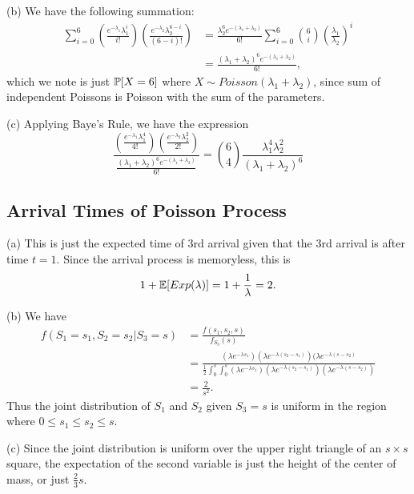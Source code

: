(b) We have the following summation:
\begin{align*}
    \sum_{i = 0}^6\left(\frac{e^{-\lambda_1}\lambda_1^i}{i!}\right)\left(\frac{e^{-\lambda_2}\lambda_2^{6 - i}}{(6 - i)!}\right) &= \frac{\lambda_2^6e^{-(\lambda_1 + \lambda_2)}}{6!}\sum_{i = 0}^6\binom{6}{i}\left(\frac{\lambda_1}{\lambda_2}\right)^i \\
    &= \frac{(\lambda_1 + \lambda_2)^6e^{-(\lambda_1 + \lambda_2)}}{6!},
\end{align*}
which we note is just $\P[X = 6]$ where $X \sim Poisson(\lambda_1 + \lambda_2)$, since sum of independent Poissons is Poisson with the sum of the parameters.

(c) Applying Baye's Rule, we have the expression
\[
    \frac{\left(\frac{e^{-\lambda_1}\lambda_1^4}{4!}\right)\left(\frac{e^{-\lambda_2}\lambda_2^2}{2!}\right)}{\frac{(\lambda_1 + \lambda_2)^6e^{-(\lambda_1 + \lambda_2)}}{6!}} = \binom{6}{4}\frac{\lambda_1^4\lambda_2^2}{(\lambda_1 + \lambda_2)^6}
\]


\subsection{Arrival Times of Poisson Process}

(a) This is just the expected time of 3rd arrival given that the 3rd arrival is after time $t = 1$. Since the arrival process is memoryless, this is 
\[
1 + \E[Exp(\lambda)] = 1 + \frac{1}{\lambda} = 2.
\]

(b) We have
\begin{align*}
    f(S_1 = s_1, S_2 = s_2 | S_3 = s) &= \frac{f(s_1, s_2, s)}{f_{S_3}(s)} \\
    &= \frac{(\lambda e^{-\lambda s_1})(\lambda e^{-\lambda (s_2 - s_1)})(\lambda e^{-\lambda (s - s_2)}}{\frac{1}{2}\int_0^s\int_0^s(\lambda e^{-\lambda s_1})(\lambda e^{-\lambda (s_2 - s_1)})(\lambda e^{-\lambda (s - s_2)})} \\
    &= \frac{2}{s^2}.
\end{align*}
Thus the joint distribution of $S_1$ and $S_2$ given $S_3 = s$ is uniform in the region where $0 \leq s_1 \leq s_2 \leq s$.

(c) Since the joint distribution is uniform over the upper right triangle of an $s\times s$ square, the expectation of the second variable is just the height of the center of mass, or just $\frac{2}{3}s$.

